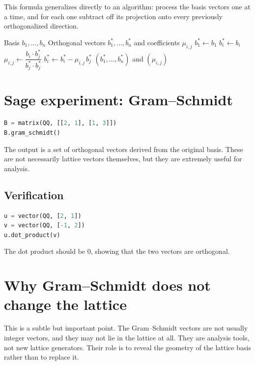This formula generalizes directly to an algorithm: process the basis vectors one at a time, and for each one subtract off its projection onto every previously orthogonalized direction.

\begin{algorithm}[H]
\caption{Gram--Schmidt Orthogonalization}
\label{alg:gram-schmidt}
\begin{algorithmic}[1]
\Require Basis $b_1,\dots,b_n$
\Ensure Orthogonal vectors $b_1^*,\dots,b_n^*$ and coefficients $\mu_{i,j}$
\State $b_1^* \gets b_1$
    \State $b_i^* \gets b_i$
        \State $\mu_{i,j} \gets \dfrac{b_i \cdot b_j^*}{b_j^* \cdot b_j^*}$
        \State $b_i^* \gets b_i^* - \mu_{i,j}\, b_j^*$
    \EndFor
\EndFor
\State \Return $(b_1^*,\dots,b_n^*)$ and $(\mu_{i,j})$
\end{algorithmic}
\end{algorithm}

\section{Sage experiment: Gram--Schmidt}

\begin{lstlisting}[language=Python]
B = matrix(QQ, [[2, 1], [1, 3]])
B.gram_schmidt()
\end{lstlisting}

The output is a set of orthogonal vectors derived from the original basis. These are not necessarily lattice vectors themselves, but they are extremely useful for analysis.

\subsection{Verification}

\begin{lstlisting}[language=Python]
u = vector(QQ, [2, 1])
v = vector(QQ, [-1, 2])
u.dot_product(v)
\end{lstlisting}

The dot product should be $0$, showing that the two vectors are orthogonal.

\section{Why Gram--Schmidt does not change the lattice}
This is a subtle but important point. The Gram--Schmidt vectors are not usually integer vectors, and they may not lie in the lattice at all. They are analysis tools, not new lattice generators. Their role is to reveal the geometry of the lattice basis rather than to replace it.

